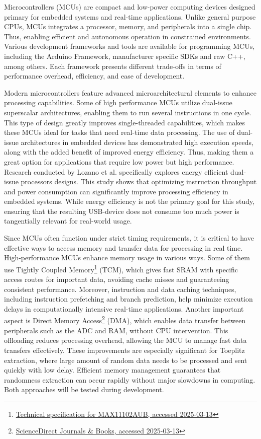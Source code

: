 \documentclass{sigchi}
\begin{document}
Microcontrollers (MCUs) are compact and low-power computing devices designed primary for embedded systems and real-time applications. Unlike general purpose CPUs, MCUs integrates a processor, memory, and peripherals into a single chip. Thus, enabling efficient and autonomous operation in constrained environments. Various development frameworks and tools are available for programming MCUs, including the Arduino Framework, manufacturer specific SDKs and raw C++, among others. Each framework presents different trade-offs in terms of performance overhead, efficiency, and ease of development.

Modern microcontrollers feature advanced microarchitectural elements to enhance processing capabilities. Some of high performance MCUs utilize dual-issue superscalar architectures, enabling them to run several instructions in one cycle. This type of design greatly improves single-threaded capabilities, which makes these MCUs ideal for tasks that need real-time data processing. The use of dual-issue architectures in embedded devices has demonstrated high execution speeds, along with the added benefit of improved energy efficiency. Thus, making them a great option for applications that require low power but high performance. Research conducted by Lozano et al. \cite{dual-issue} specifically explores energy efficient dual-issue processors designs. This study shows that optimizing instruction throughput and power consumption can significantly improve processing efficiency in embedded systems. While energy efficiency is not the primary goal for this study, ensuring that the resulting USB-device does not consume too much power is tangentially relevant for real-world usage.

Since MCUs often function under strict timing requirements, it is critical to have effective ways to access memory and transfer data for processing in real time. High-performance MCUs enhance memory usage in various ways. Some of them use Tightly Coupled Memory\footnote{\href{https://www.farnell.com/datasheets/1913106.pdf}{Technical specification for MAX11102AUB, accessed 2025-03-13}} (TCM), which gives fast SRAM with specific access routes for important data, avoiding cache misses and guaranteeing consistent performance. Moreover, instruction and data caching techniques, including instruction prefetching and branch prediction, help minimize execution delays in computationally intensive real-time applications. Another important aspect is Direct Memory Access\footnote{\href{https://www.sciencedirect.com/topics/computer-science/direct-memory-access}{ScienceDirect Journals \& Books, accessed 2025-03-13}} (DMA), which enables data transfer between peripherals such as the ADC and RAM, without CPU intervention. This offloading reduces processing overhead, allowing the MCU to manage fast data transfers effectively. These improvements are especially significant for Toeplitz extraction, where large amount of random data needs to be processed and sent quickly with low delay. Efficient memory management guarantees that randomness extraction can occur rapidly without major slowdowns in computing. Both approaches will be tested during development.
\end{document}
